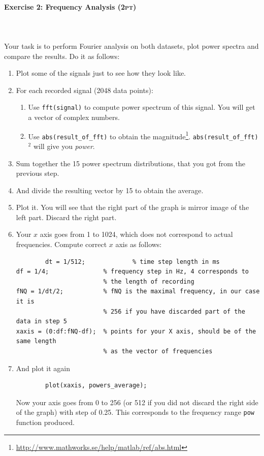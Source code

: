 \documentclass[a4paper,11pt]{article}
\newenvironment{exercise}[3]{\paragraph{Exercise #1: #2 \textsc{(#3pt)}}\ \\}{
\medskip}
\begin{document}
\begin{exercise}{2}{Frequency Analysis}{2}
\ \\
Your task is to perform Fourier analysis on both datasets, plot power spectra and compare the results. Do it as follows:
\begin{enumerate}
	\item Plot some of the signals just to see how they look like.
	\item For each recorded signal (2048 data points):
		\begin{enumerate}
			\item Use \texttt{fft(signal)} to compute power spectrum of this signal. You will get a vector of complex numbers.
			\item Use \texttt{abs(result\_of\_fft)} to obtain the magnitude\footnote{\url{http://www.mathworks.se/help/matlab/ref/abs.html}}. \texttt{abs(result\_of\_fft)}$^2$ will give you \emph{power}.
		\end{enumerate}
	\item Sum together the 15 power spectrum distributions, that you got from the previous step.
	\item And divide the resulting vector by 15 to obtain the average.
	\item Plot it. You will see that the right part of the graph is mirror image of the left part. Discard the right part.
	\item Your $x$ axis goes from 1 to 1024, which does not correspond to actual frequencies. Compute correct $x$ axis as follows:
		\begin{verbatim}
		dt = 1/512;             % time step length in ms
df = 1/4;               % frequency step in Hz, 4 corresponds to 
                        % the length of recording
fNQ = 1/dt/2;           % fNQ is the maximal frequency, in our case it is
                        % 256 if you have discarded part of the data in step 5 
xaxis = (0:df:fNQ-df);  % points for your X axis, should be of the same length 
                        % as the vector of frequencies
		\end{verbatim}
	\item And plot it again
		\begin{verbatim}
		plot(xaxis, powers_average);
		\end{verbatim}
		Now your axis goes from 0 to 256 (or 512 if you did not discard the right side of the graph) with step of 0.25. This corresponds to the frequency range \texttt{pow} function produced.
\end{enumerate}


\end{exercise}
\end{document}
